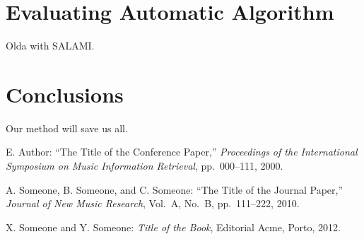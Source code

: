 \documentclass{article}
\begin{document}
\section{Evaluating Automatic Algorithm}

Olda with SALAMI.




\section{Conclusions}

Our method will save us all.

\begin{thebibliography}{citations}

E. Author:
``The Title of the Conference Paper,''
{\it Proceedings of the International Symposium
on Music Information Retrieval}, pp.~000--111, 2000.

A. Someone, B. Someone, and C. Someone:
``The Title of the Journal Paper,''
{\it Journal of New Music Research},
Vol.~A, No.~B, pp.~111--222, 2010.

 X. Someone and Y. Someone: {\it Title of the Book},
    Editorial Acme, Porto, 2012.

\end{thebibliography}

%
\end{document}
